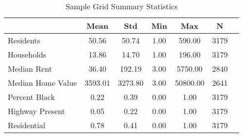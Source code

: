 \begin{table}[h]
\centering
\caption{Sample Grid Summary Statistics}
\label{tab:summary_stats}
\begin{tabular}{lcccccc}
\toprule
 & Mean & Std & Min & Max & N \\
\midrule
Residents & 50.56 & 50.74 & 1.00 & 590.00 & 3179 \\
\cline{1-1}
Households & 13.86 & 14.70 & 1.00 & 196.00 & 3179 \\
\cline{1-1}
Median Rent & 36.40 & 192.19 & 3.00 & 5750.00 & 2840 \\
\cline{1-1}
Median Home Value & 3593.01 & 3273.80 & 3.00 & 50800.00 & 2641 \\
\cline{1-1}
Percent Black & 0.22 & 0.39 & 0.00 & 1.00 & 3179 \\
\cline{1-1}
Highway Present & 0.05 & 0.22 & 0.00 & 1.00 & 3179 \\
\cline{1-1}
Residential & 0.78 & 0.41 & 0.00 & 1.00 & 3179 \\
\cline{1-1}
\bottomrule
\end{tabular}
\end{table}
